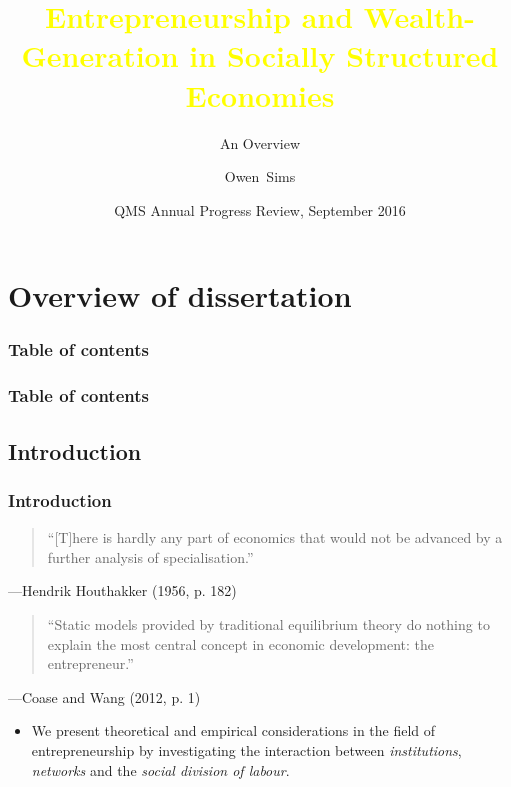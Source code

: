 \documentclass[10pt]{beamer}
\title[EntrepreneurshipSSE]{\textcolor{yellow}{Entrepreneurship and Wealth-Generation in Socially Structured Economies}}
\subtitle{An Overview}
\author[Sims]{Owen~Sims}
\institute[QUB]{Center for Data Science and Scalable Computing\\ Queen's University Belfast}
\date[APR 2016]{QMS Annual Progress Review, September 2016}
\begin{document}
\begin{frame}
\titlepage
\end{frame}

\section{Overview of dissertation}

\begin{frame}
\frametitle{Table of contents}
\tableofcontents
\end{frame}

\begin{frame}
\frametitle{Table of contents}
\tableofcontents[currentsection]
\end{frame}

\subsection{Introduction}

\begin{frame} \frametitle{Introduction}
\begin{quotation}
``[T]here is hardly any part of economics that would not be advanced by a further analysis of specialisation.''
\end{quotation}
\begin{flushright}
---Hendrik Houthakker (1956, p. 182)
\end{flushright}
\begin{quotation}
``Static models provided by traditional equilibrium theory do nothing to explain the most central concept in economic development: the entrepreneur.''
\end{quotation}
\begin{flushright}
---Coase and Wang  (2012, p. 1)
\end{flushright}
\begin{itemize}
\medskip
\item We present theoretical and empirical considerations in the field of entrepreneurship by investigating the interaction between \emph{institutions}, \emph{networks} and the \emph{social division of labour}.
\medskip
\end{itemize}
\end{frame}
\end{document}
